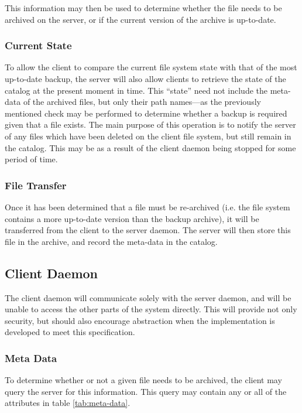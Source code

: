 This information may then be used to determine whether the file needs to be
archived on the server, or if the current version of the archive is up-to-date.

\subsubsection{Current State}

To allow the client to compare the current file system state with that of the
most up-to-date backup, the server will also allow clients to retrieve the
state of the catalog at the present moment in time. This ``state'' need not
include the meta-data of the archived files, but only their path names---as the
previously mentioned check may be performed to determine whether a backup is
required given that a file exists. The main purpose of this operation is to
notify the server of any files which have been deleted on the client file
system, but still remain in the catalog. This may be as a result of the client
daemon being stopped for some period of time.

\subsubsection{File Transfer}

Once it has been determined that a file must be re-archived (i.e. the file
system contains a more up-to-date version than the backup archive), it will be
transferred from the client to the server daemon. The server will then store
this file in the archive, and record the meta-data in the catalog.

\subsection{Client Daemon}

The client daemon will communicate solely with the server daemon, and will be
unable to access the other parts of the system directly. This will provide not
only security, but should also encourage abstraction when the implementation is
developed to meet this specification.

\subsubsection{Meta Data}

To determine whether or not a given file needs to be archived, the client may
query the server for this information. This query may contain any or all of the
attributes in table \ref{tab:meta-data}.

